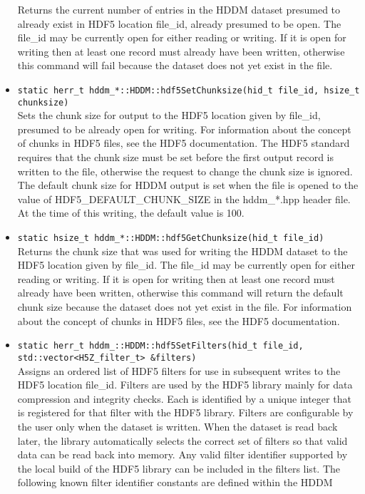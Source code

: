 \documentclass{revtex4}
\begin{document}
\begin{itemize}
Returns the current number of entries in the HDDM dataset presumed to already
exist in HDF5 location file\_id, already presumed to be open. The file\_id may
be currently open for either reading or writing. If it is open for writing
then at least one record must already have been written, otherwise this command
will fail because the dataset does not yet exist in the file.
\item \texttt{static herr\_t hddm\_*::HDDM::hdf5SetChunksize(hid\_t file\_id, hsize\_t chunksize)}\\
Sets the chunk size for output to the HDF5 location given by file\_id, presumed
to be already open for writing. For information about the concept of chunks in
HDF5 files, see the HDF5 documentation. The HDF5 standard requires that the
chunk size must be set before the first output record is written to the file,
otherwise the request to change the chunk size is ignored. The default chunk 
size for HDDM output is set when the file is opened to the value of 
HDF5\_DEFAULT\_CHUNK\_SIZE in the hddm\_*.hpp header file. At the time of this
writing, the default value is 100.
\item \texttt{static hsize\_t hddm\_*::HDDM::hdf5GetChunksize(hid\_t file\_id)}\\
Returns the chunk size that was used for writing the HDDM dataset to the HDF5
location given by file\_id.  The file\_id may be currently open for either
reading or writing. If it is open for writing then at least one record must
already have been written, otherwise this command will return the default
chunk size because the dataset does not yet exist in the file. For information
about the concept of chunks in HDF5 files, see the HDF5 documentation.
\item \texttt{static herr\_t hddm\_\*::HDDM::hdf5SetFilters(hid\_t file\_id, std::vector<H5Z\_filter\_t> \&filters)}\\
Assigns an ordered list of HDF5 filters for use in subsequent writes to the HDF5
location file\_id.  Filters are used by the HDF5 library mainly for data 
compression and integrity checks. Each is identified by a unique integer that
is registered for that filter with the HDF5 library. Filters are configurable
by the user only when the dataset is written. When the dataset is read back 
later, the library automatically selects the correct set of filters so that
valid data can be read back into memory. Any valid filter identifier supported
by the local build of the HDF5 library can be included in the filters list.
The following known filter identifier constants are defined within the HDDM 

\end{itemize}
\end{document}
